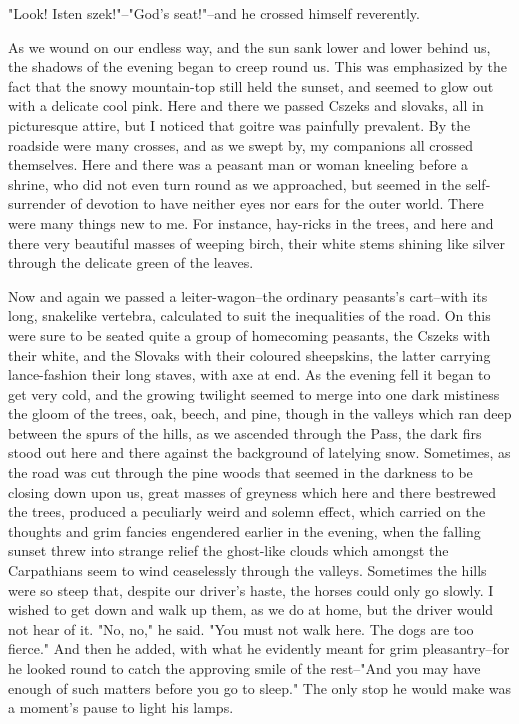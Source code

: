 "Look! Isten szek!"--"God's seat!"--and he crossed himself reverently.

As we wound on our endless way, and the sun sank lower and lower behind us, the shadows of the evening began to creep round us. This was emphasized by the fact that the snowy mountain-top still held the sunset, and seemed to glow out with a delicate cool pink. Here and there we passed Cszeks and slovaks, all in picturesque attire, but I noticed that goitre was painfully prevalent. By the roadside were many crosses, and as we swept by, my companions all crossed themselves. Here and there was a peasant man or woman kneeling before a shrine, who did not even turn round as we approached, but seemed in the self-surrender of devotion to have neither eyes nor ears for the outer world. There were many things new to me. For instance, hay-ricks in the trees, and here and there very beautiful masses of weeping birch, their white stems shining like silver through the delicate green of the leaves.

Now and again we passed a leiter-wagon--the ordinary peasants's cart--with its long, snakelike vertebra, calculated to suit the inequalities of the road. On this were sure to be seated quite a group of homecoming peasants, the Cszeks with their white, and the Slovaks with their coloured sheepskins, the latter carrying lance-fashion their long staves, with axe at end. As the evening fell it began to get very cold, and the growing twilight seemed to merge into one dark mistiness the gloom of the trees, oak, beech, and pine, though in the valleys which ran deep between the spurs of the hills, as we ascended through the Pass, the dark firs stood out here and there against the background of latelying snow. Sometimes, as the road was cut through the pine woods that seemed in the darkness to be closing down upon us, great masses of greyness which here and there bestrewed the trees, produced a peculiarly weird and solemn effect, which carried on the thoughts and grim fancies engendered earlier in the evening, when the falling sunset threw into strange relief the ghost-like clouds which amongst the Carpathians seem to wind ceaselessly through the valleys. Sometimes the hills were so steep that, despite our driver's haste, the horses could only go slowly. I wished to get down and walk up them, as we do at home, but the driver would not hear of it. "No, no," he said. "You must not walk here. The dogs are too fierce." And then he added, with what he evidently meant for grim pleasantry--for he looked round to catch the approving smile of the rest--"And you may have enough of such matters before you go to sleep." The only stop he would make was a moment's pause to light his lamps.

